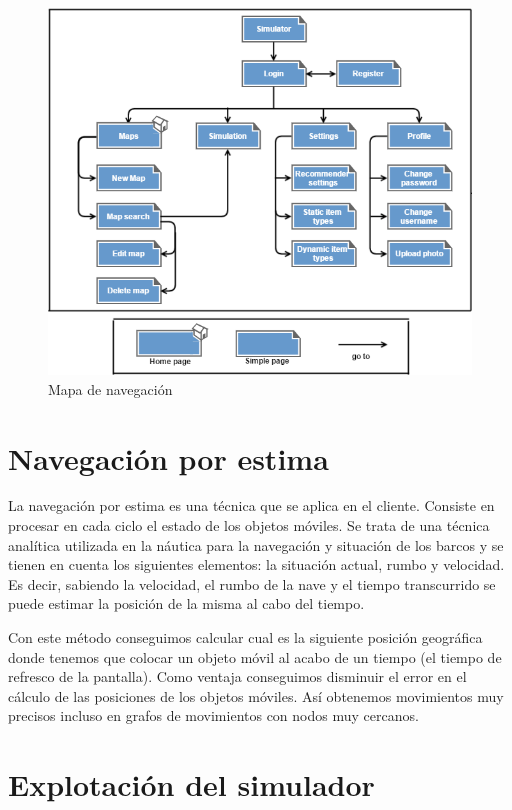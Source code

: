 \begin{figure}[H]
\centering\includegraphics[scale=0.7]{imagenes/mapa-navegacion.png}
\caption{Mapa de navegación}
\label{mapaNavegacion}
\end{figure}

\newpage

\section{Navegación por estima}

La navegación por estima es una técnica que se aplica en el cliente. Consiste en procesar en cada ciclo el estado de los objetos móviles. Se trata de una técnica analítica utilizada en la náutica para la navegación y situación de los barcos y se tienen en cuenta los siguientes elementos: la situación actual, rumbo y velocidad. Es decir, sabiendo la velocidad, el rumbo de la nave y el tiempo transcurrido se puede estimar la posición de la misma al cabo del tiempo. 

Con este método conseguimos calcular cual es la siguiente posición geográfica donde tenemos que colocar un objeto móvil al acabo de un tiempo (el tiempo de refresco de la pantalla). Como ventaja conseguimos disminuir el error en el cálculo de las posiciones de los objetos móviles. Así obtenemos movimientos muy precisos incluso en grafos de movimientos con nodos muy cercanos.

\section{Explotación del simulador}

